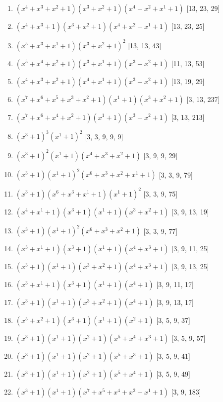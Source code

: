 \documentclass[10pt,twocolumn]{article}
\begin{document}
\begin{enumerate}
\item $(x^{4} + x^{3} + x^{2} + 1)(x^{3} + x^{2} + 1)(x^{4} + x^{2} + x^{1} + 1)$  [13, 23, 29]
\item $(x^{4} + x^{3} + 1)(x^{3} + x^{2} + 1)(x^{4} + x^{2} + x^{1} + 1)$  [13, 23, 25]
\item $(x^{5} + x^{3} + x^{1} + 1)(x^{3} + x^{2} + 1)^{2}$  [13, 13, 43]
\item $(x^{5} + x^{4} + x^{2} + 1)(x^{3} + x^{1} + 1)(x^{3} + x^{2} + 1)$  [11, 13, 53]
\item $(x^{4} + x^{3} + x^{2} + 1)(x^{4} + x^{1} + 1)(x^{3} + x^{2} + 1)$  [13, 19, 29]
\item $(x^{7} + x^{6} + x^{5} + x^{3} + x^{2} + 1)(x^{1} + 1)(x^{3} + x^{2} + 1)$  [3, 13, 237]
\item $(x^{7} + x^{6} + x^{4} + x^{2} + 1)(x^{1} + 1)(x^{3} + x^{2} + 1)$  [3, 13, 213]
\item $(x^{3} + 1)^{3}(x^{1} + 1)^{2}$  [3, 3, 9, 9, 9]
\item $(x^{3} + 1)^{2}(x^{1} + 1)(x^{4} + x^{3} + x^{2} + 1)$  [3, 9, 9, 29]
\item $(x^{3} + 1)(x^{1} + 1)^{2}(x^{6} + x^{3} + x^{2} + x^{1} + 1)$  [3, 3, 9, 79]
\item $(x^{3} + 1)(x^{6} + x^{3} + x^{1} + 1)(x^{1} + 1)^{2}$  [3, 3, 9, 75]
\item $(x^{4} + x^{1} + 1)(x^{3} + 1)(x^{1} + 1)(x^{3} + x^{2} + 1)$  [3, 9, 13, 19]
\item $(x^{3} + 1)(x^{1} + 1)^{2}(x^{6} + x^{3} + x^{2} + 1)$  [3, 3, 9, 77]
\item $(x^{3} + x^{1} + 1)(x^{3} + 1)(x^{1} + 1)(x^{4} + x^{3} + 1)$  [3, 9, 11, 25]
\item $(x^{3} + 1)(x^{1} + 1)(x^{3} + x^{2} + 1)(x^{4} + x^{3} + 1)$  [3, 9, 13, 25]
\item $(x^{3} + x^{1} + 1)(x^{3} + 1)(x^{1} + 1)(x^{4} + 1)$  [3, 9, 11, 17]
\item $(x^{3} + 1)(x^{1} + 1)(x^{3} + x^{2} + 1)(x^{4} + 1)$  [3, 9, 13, 17]
\item $(x^{5} + x^{2} + 1)(x^{3} + 1)(x^{1} + 1)(x^{2} + 1)$  [3, 5, 9, 37]
\item $(x^{3} + 1)(x^{1} + 1)(x^{2} + 1)(x^{5} + x^{4} + x^{3} + 1)$  [3, 5, 9, 57]
\item $(x^{3} + 1)(x^{1} + 1)(x^{2} + 1)(x^{5} + x^{3} + 1)$  [3, 5, 9, 41]
\item $(x^{3} + 1)(x^{1} + 1)(x^{2} + 1)(x^{5} + x^{4} + 1)$  [3, 5, 9, 49]
\item $(x^{3} + 1)(x^{1} + 1)(x^{7} + x^{5} + x^{4} + x^{2} + x^{1} + 1)$  [3, 9, 183]

\end{enumerate}
\end{document}
